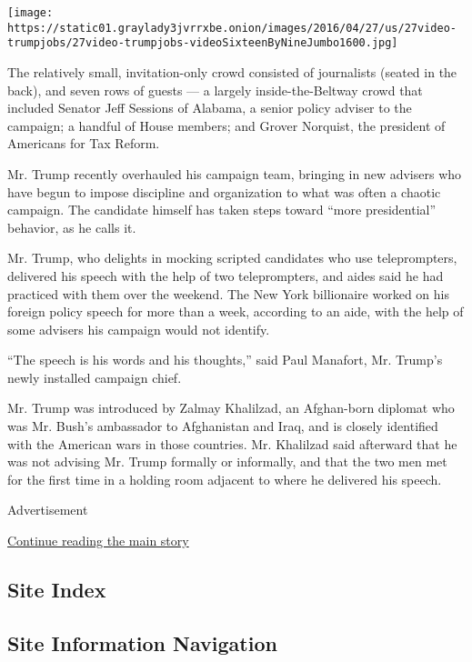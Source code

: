 \texttt{[image: https://static01.graylady3jvrrxbe.onion/images/2016/04/27/us/27video-trumpjobs/27video-trumpjobs-videoSixteenByNineJumbo1600.jpg]}

The relatively small, invitation-only crowd consisted of journalists
(seated in the back), and seven rows of guests --- a largely
inside-the-Beltway crowd that included Senator Jeff Sessions of Alabama,
a senior policy adviser to the campaign; a handful of House members; and
Grover Norquist, the president of Americans for Tax Reform.

Mr. Trump recently overhauled his campaign team, bringing in new
advisers who have begun to impose discipline and organization to what
was often a chaotic campaign. The candidate himself has taken steps
toward ``more presidential'' behavior, as he calls it.

Mr. Trump, who delights in mocking scripted candidates who use
teleprompters, delivered his speech with the help of two teleprompters,
and aides said he had practiced with them over the weekend. The New York
billionaire worked on his foreign policy speech for more than a week,
according to an aide, with the help of some advisers his campaign would
not identify.

``The speech is his words and his thoughts,'' said Paul Manafort, Mr.
Trump's newly installed campaign chief.

Mr. Trump was introduced by Zalmay Khalilzad, an Afghan-born diplomat
who was Mr. Bush's ambassador to Afghanistan and Iraq, and is closely
identified with the American wars in those countries. Mr. Khalilzad said
afterward that he was not advising Mr. Trump formally or informally, and
that the two men met for the first time in a holding room adjacent to
where he delivered his speech.

Advertisement

\protect\hyperlink{after-bottom}{Continue reading the main story}

\hypertarget{site-index}{%
\subsection{Site Index}\label{site-index}}

\hypertarget{site-information-navigation}{%
\subsection{Site Information
Navigation}\label{site-information-navigation}}

